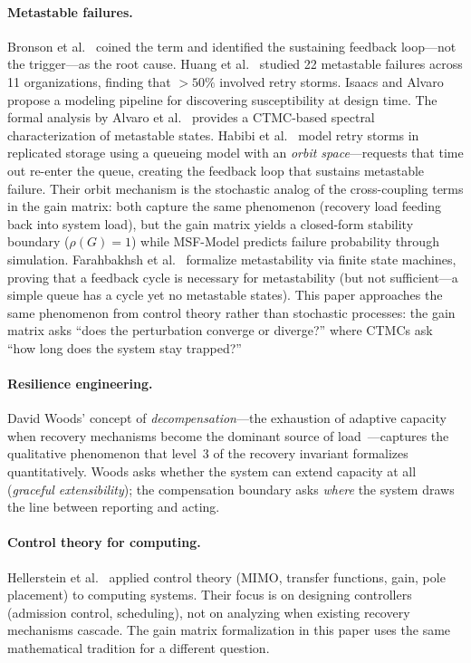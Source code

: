\documentclass[11pt]{article}
\begin{document}
\paragraph{Metastable failures.} Bronson et al.~\cite{bronson2021metastable}
coined the term and identified the sustaining feedback loop---not the
trigger---as the root cause. Huang et al.~\cite{huang2022metastable} studied 22
metastable failures across 11 organizations, finding that ${>}50\%$ involved
retry storms. Isaacs and Alvaro~\cite{isaacs2025analyzing} propose a modeling
pipeline for discovering susceptibility at design time. The formal analysis by
Alvaro et al.~\cite{alvaro2025formal} provides a CTMC-based spectral
characterization of metastable states. Habibi et
al.~\cite{habibi2024msf} model retry storms in replicated storage using
a queueing model with an \emph{orbit space}---requests that time out re-enter
the queue, creating the feedback loop that sustains metastable failure. Their
orbit mechanism is the stochastic analog of the cross-coupling terms in the
gain matrix: both capture the same phenomenon (recovery load feeding back into
system load), but the gain matrix yields a closed-form stability boundary
($\rho(G) = 1$) while MSF-Model predicts failure probability through
simulation. Farahbakhsh et al.~\cite{farahbakhsh2025modeling} formalize
metastability via finite state machines, proving that a feedback cycle is
necessary for metastability (but not sufficient---a simple queue has a cycle
yet no metastable states).
This paper approaches the same phenomenon
from control theory rather than stochastic processes: the gain matrix asks
``does the perturbation converge or diverge?'' where CTMCs ask ``how long does
the system stay trapped?''

\paragraph{Resilience engineering.} David Woods' concept of
\emph{decompensation}---the exhaustion of adaptive capacity when recovery
mechanisms become the dominant source of
load~\cite{woods2015four,woods2018theory}---captures the qualitative phenomenon
that level~3 of the recovery invariant formalizes quantitatively. Woods asks
whether the system can extend capacity at all (\emph{graceful extensibility});
the compensation boundary asks \emph{where} the system draws the line between
reporting and acting.

\paragraph{Control theory for computing.} Hellerstein et
al.~\cite{hellerstein2004feedback} applied control theory (MIMO, transfer
functions, gain, pole placement) to computing systems. Their focus is on
designing controllers (admission control, scheduling), not on analyzing when
existing recovery mechanisms cascade. The gain matrix formalization in this paper
uses the same mathematical tradition for a different question.
\end{document}
